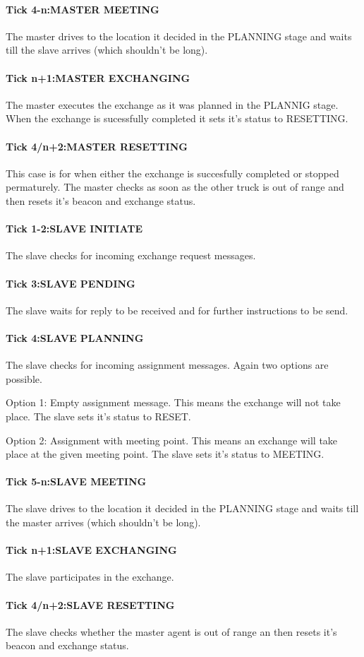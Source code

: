 \documentclass[../main.tex]{subfiles}
\begin{document}
\paragraph{Tick 4-n:MASTER MEETING}
The master drives to the location it decided in the PLANNING stage and waits till the slave arrives (which shouldn't be long).

\paragraph{Tick n+1:MASTER EXCHANGING}
The master executes the exchange as it was planned in the PLANNIG stage.
When the exchange is sucessfully completed it sets it's status to RESETTING.
\paragraph{Tick 4/n+2:MASTER RESETTING}
This case is for when either the exchange is succesfully completed or stopped permaturely.
The master checks as soon as the other truck is out of range and then resets it's beacon and exchange status.

\paragraph{Tick 1-2:SLAVE INITIATE}
The slave checks for incoming exchange request messages.
\paragraph{Tick 3:SLAVE PENDING}
The slave waits for reply to be received and for further instructions to be send.
\paragraph{Tick 4:SLAVE PLANNING}
The slave checks for incoming assignment messages.
Again two options are possible.

Option 1: Empty assignment message.
This means the exchange will not take place.
The slave sets it's status to RESET.

Option 2: Assignment with meeting point.
This means an exchange will take place at the given meeting point.
The slave sets it's status to MEETING.
\paragraph{Tick 5-n:SLAVE MEETING}
The slave drives to the location it decided in the PLANNING stage and waits till the master arrives (which shouldn't be long).
\paragraph{Tick n+1:SLAVE EXCHANGING}
The slave participates in the exchange.
\paragraph{Tick 4/n+2:SLAVE RESETTING}
The slave checks whether the master agent is out of range an then resets it's beacon and exchange status.
\end{document}
